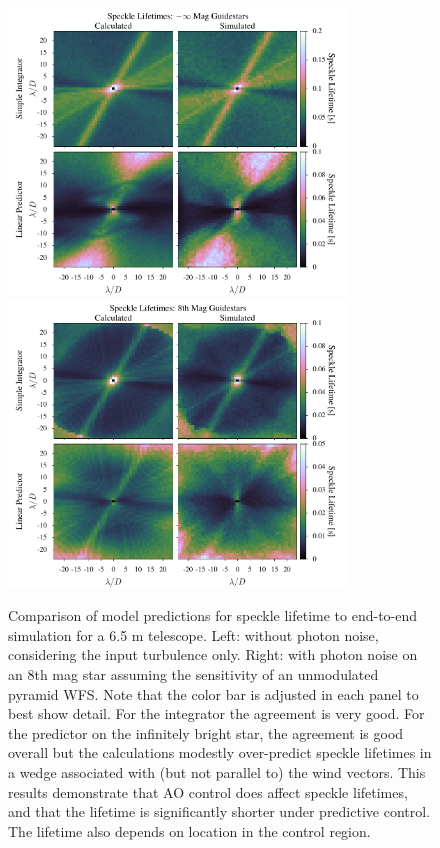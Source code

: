 \documentclass[10pt,preprint]{aastex631}
\begin{document}
\begin{figure}
\hspace{-0.3in}
\includegraphics[width=3.54in]{lifetimes0mag.pdf}
\includegraphics[width=3.54in]{lifetimes8mag.pdf}
\caption{Comparison of model predictions for speckle lifetime to end-to-end simulation for a 6.5 m telescope.  Left: without photon noise, considering the input turbulence only.  Right: with photon noise on an 8th mag star assuming the sensitivity of an unmodulated pyramid WFS. Note that the color bar is adjusted in each panel to best show detail. For the integrator the agreement is very good.  For the predictor on the infinitely bright star, the agreement is good overall but the calculations modestly over-predict speckle lifetimes in a wedge associated with (but not parallel to) the wind vectors.  This results demonstrate that AO control does affect speckle lifetimes, and that the lifetime is significantly shorter under predictive control.  The lifetime also depends on location in the control region. \label{fig:lifetime_2Dcomp}}
\end{figure}
\end{document}
